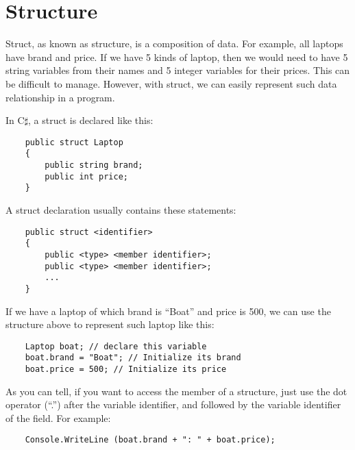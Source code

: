 \documentclass[../main.tex]{subfiles}
\begin{document}
\section{Structure}

Struct, as known as structure, is a composition of data. For example, all
laptops have brand and price. If we have 5 kinds of laptop, then we would need
to have 5 string variables from their names and 5 integer variables for their
prices. This can be difficult to manage. However, with struct, we can easily
represent such data relationship in a program.

In C$\sharp$, a struct is declared like this:

\begin{verbatim}
    public struct Laptop
    {
        public string brand;
        public int price;
    }
\end{verbatim}

A struct declaration usually contains these statements:

\begin{verbatim}
    public struct <identifier>
    {
        public <type> <member identifier>;
        public <type> <member identifier>;
        ...
    }
\end{verbatim}

If we have a laptop of which brand is ``Boat'' and price is 500, we can use the
structure above to represent such laptop like this:

\begin{verbatim}
    Laptop boat; // declare this variable
    boat.brand = "Boat"; // Initialize its brand
    boat.price = 500; // Initialize its price
\end{verbatim}

As you can tell, if you want to access the member of a structure, just use the
dot operator (``.'') after the variable identifier, and followed by the variable
identifier of the field. For example:

\begin{verbatim}
    Console.WriteLine (boat.brand + ": " + boat.price);
\end{verbatim}
\end{document}
